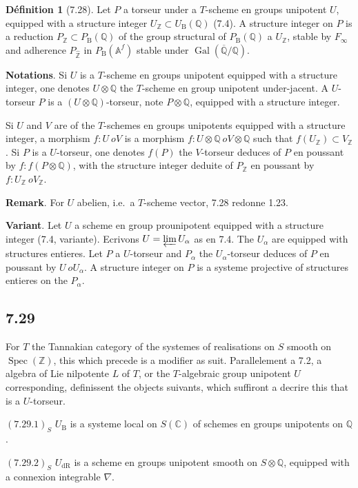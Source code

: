 \documentclass[12pt,a4paper]{article}
\theoremstyle{plain}
\theoremstyle{definition}
\newtheorem{definition}[theorem]{D\'efinition}
\theoremstyle{remark}
\DeclareMathOperator{\Spec}{Spec}
\DeclareMathOperator{\Gal}{Gal}
\newcommand{\DR}{\mathrm{dR}}
\newcommand{\B}{\mathrm{B}}
\newcommand{\Z}{\mathbb{Z}}
\newcommand{\Q}{\mathbb{Q}}
\newcommand{\C}{\mathbb{C}}
\newcommand{\A}{\mathbb{A}}
\begin{document}
\begin{definition}[7.28]\label{def:7.28}
Let $P$ a torseur under a $T$-scheme en groups unipotent $U$, equipped with a structure integer $U_\Z \subset U_\B(\Q)$ (7.4). A structure integer on $P$ is a reduction $P_\Z \subset P_\B(\Q)$ of the group structural of $P_\B(\Q)$ a $U_\Z$, stable by $F_\infty$ and adherence $P_{\hat{\Z}}$ in $P_\B(\A^f)$ stable under $\Gal(\overline{\Q}/\Q)$.
\end{definition}

\textbf{Notations}. Si $U$ is a $T$-scheme en groups unipotent equipped with a structure integer, one denotes $U \otimes \Q$ the $T$-scheme en group unipotent under-jacent. A $U$-torseur $P$ is a $(U \otimes \Q)$-torseur, note $P \otimes \Q$, equipped with a structure integer.

Si $U$ and $V$ are of the $T$-schemes en groups unipotents equipped with a structure integer, a morphism $f: U \	o V$ is a morphism $f: U \otimes \Q \	o V \otimes \Q$ such that $f(U_\Z) \subset V_\Z$. Si $P$ is a $U$-torseur, one denotes $f(P)$ the $V$-torseur deduces of $P$ en poussant by $f: f(P \otimes \Q)$, with the structure integer deduite of $P_\Z$ en poussant by $f: U_\Z \	o V_\Z$.

\textbf{Remark}. For $U$ abelien, i.e.~a $T$-scheme vector, 7.28 redonne 1.23.

\textbf{Variant}. Let $U$ a scheme en group prounipotent equipped with a structure integer (7.4, variante). Ecrivons $U = 
\varprojlim U_\alpha$ as en 7.4. The $U_\alpha$ are equipped with structures entieres. Let $P$ a $U$-torseur and $P_\alpha$ the $U_\alpha$-torseur deduces of $P$ en poussant by $U \	o U_\alpha$. A structure integer on $P$ is a systeme projective of structures entieres on the $P_\alpha$.

\subsection*{7.29}
For $T$ the Tannakian category of the systemes of realisations on $S$ smooth on $\Spec(\Z)$, this which precede is a modifier as suit. Parallelement a 7.2, a algebra of Lie nilpotente $L$ of $T$, or the $T$-algebraic group unipotent $U$ corresponding, definissent the objects suivants, which suffiront a decrire this that is a $U$-torseur.

$(7.29.1)_S$ $U_\B$ is a systeme local on $S(\C)$ of schemes en groups unipotents on $\Q$.

$(7.29.2)_S$ $U_\DR$ is a scheme en groups unipotent smooth on $S \otimes \Q$, equipped with a connexion integrable $\nabla$.
\end{document}
